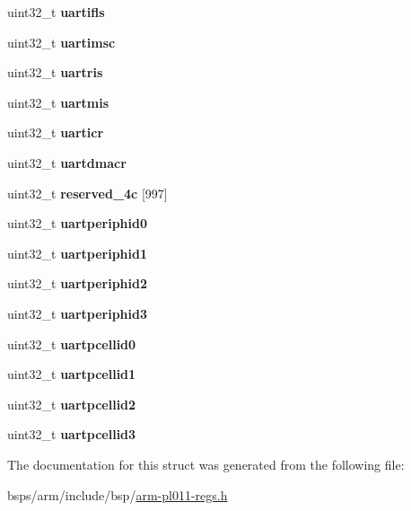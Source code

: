 \begin{DoxyCompactItemize}
\mbox{\label{structpl011_a7bc0ead7862c16d4124c83f1b6d2e4b5}} 
uint32\+\_\+t {\bfseries uartifls}
\item 
\mbox{\label{structpl011_a5dff4e9830e0a256e1c8687a87e27c66}} 
uint32\+\_\+t {\bfseries uartimsc}
\item 
\mbox{\label{structpl011_ace0ee02318d6e10c9a6cf5bc7e29cbb6}} 
uint32\+\_\+t {\bfseries uartris}
\item 
\mbox{\label{structpl011_a7f2ae929631551e584aa4076126f16b0}} 
uint32\+\_\+t {\bfseries uartmis}
\item 
\mbox{\label{structpl011_a054c364c01d8991aab21e758d3535aca}} 
uint32\+\_\+t {\bfseries uarticr}
\item 
\mbox{\label{structpl011_ade93bdb775506815b3a4d0b774e5cc79}} 
uint32\+\_\+t {\bfseries uartdmacr}
\item 
\mbox{\label{structpl011_a464f131b03a003ae25b8a5e0bf091be4}} 
uint32\+\_\+t {\bfseries reserved\+\_\+4c} \mbox{[}997\mbox{]}
\item 
\mbox{\label{structpl011_a71a1f4542e89a0c208a2182d25a21f59}} 
uint32\+\_\+t {\bfseries uartperiphid0}
\item 
\mbox{\label{structpl011_a8fd3bf64cc79f8c183c80b3ed1fcd9c5}} 
uint32\+\_\+t {\bfseries uartperiphid1}
\item 
\mbox{\label{structpl011_a621feddf0e07d5bf821d233ba13f8cc5}} 
uint32\+\_\+t {\bfseries uartperiphid2}
\item 
\mbox{\label{structpl011_a644c3f4fdd7a5fefa89adfb8e9635a5f}} 
uint32\+\_\+t {\bfseries uartperiphid3}
\item 
\mbox{\label{structpl011_a1d90e0b314e785d070acee9dc62d0927}} 
uint32\+\_\+t {\bfseries uartpcellid0}
\item 
\mbox{\label{structpl011_af43a2df667bf906f4431db79518334d4}} 
uint32\+\_\+t {\bfseries uartpcellid1}
\item 
\mbox{\label{structpl011_a692311fb3455c30c92c6588c84c86ed3}} 
uint32\+\_\+t {\bfseries uartpcellid2}
\item 
\mbox{\label{structpl011_a5fd803bb86a4f988f39a37a1d77d3eb1}} 
uint32\+\_\+t {\bfseries uartpcellid3}
\end{DoxyCompactItemize}


The documentation for this struct was generated from the following file\+:\begin{DoxyCompactItemize}
\item 
bsps/arm/include/bsp/\mbox{\hyperlink{arm-pl011-regs_8h}{arm-\/pl011-\/regs.\+h}}\end{DoxyCompactItemize}
